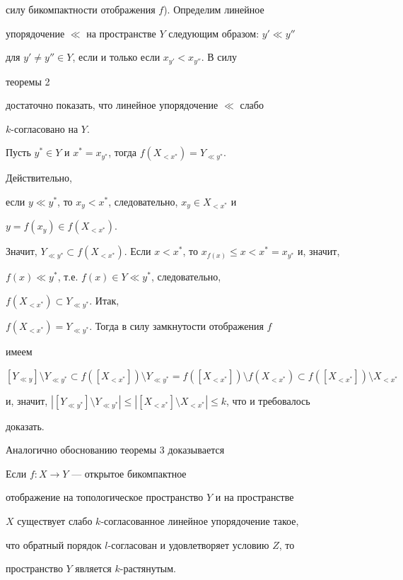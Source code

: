 силу бикомпактности отображения $f$). Определим линейное 


упорядочение $\ll$ на пространстве $Y$ следующим образом: $y'\ll y''$ 


для $y'\ne y''\in Y$, если и только если $x_{y'}<x_{y''}$. В силу 


теоремы 2  


достаточно показать, что линейное упорядочение $\ll$ слабо  


$k$-согласовано на $Y$. 


 


Пусть $y^*\in Y$ и $x^*=x_{y^*}$, тогда $f(X_{<x^*})=Y_{\ll y^*}$. 


Действительно,  


если $y\ll y^*$, то $x_y<x^*$, следовательно, $x_y\in X_{<x^*}$ и 


$y=f(x_y)\in f(X_{<x^*})$. 


Значит, $Y_{\ll y^*}\subset f(X_{<x^*})$. Если $x<x^*$, то $x_{f(x)}\le 


x<x^*=x_{y^*}$ и, значит,  


$f(x)\ll y^*$, т.е. $f(x)\in Y\ll y^*$, следовательно, 


$f(X_{<x^*})\subset Y_{\ll y^*}$. Итак, 


$f(X_{<x^*})=Y_{\ll y^*}$. Тогда в силу замкнутости отображения $f$ 


имеем  


$[Y_{\ll y}]\setminus Y_{\ll y^*}\subset f([X_{<x^*}])\setminus Y_{\ll 


y^*}=f([X_{<x^*}])\setminus f(X_{<x^*})\subset f([X_{<x^*}])\setminus 


X_{<x^*}$ 


и, значит, $|[Y_{\ll y^*}]\setminus Y_{\ll y^*}|\le|[X_{<x^*}]\setminus 


X_{<x^*}|\le k$, что и требовалось 


доказать. 


 


Аналогично обоснованию теоремы 3 доказывается  


 


\begin{thm} 


Если $f:X\to Y$ --- открытое бикомпактное 


отображение на топологическое пространство $Y$ и на пространстве 


$X$ существует слабо $k$-согласованное линейное упорядочение такое, 


что обратный порядок $l$-согласован и удовлетворяет условию $Z$, то 


пространство $Y$ является $k$-растянутым. 


\end{thm} 


